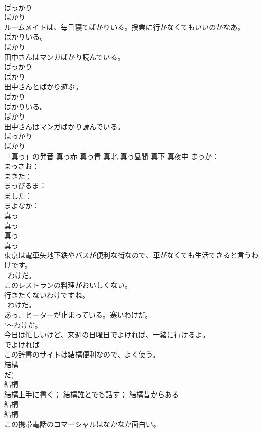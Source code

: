 \documentclass[8pt]{extreport}
\begin{document}
\begin{CJK}{UTF8}{min}
{\\	ばっかり 
\\	ばかり
\\	ルームメイトは、毎日寝てばかりいる。授業に行かなくてもいいのかなあ。	
\\	ばかりいる。 
\\	ばかり 
\\	田中さんはマンガばかり読んでいる。 
\\	ばっかり 
\\	ばかり
\\	田中さんとばかり遊ぶ。	
\\	ばかり　
\\	ばかりいる。 
\\	ばかり 
\\	田中さんはマンガばかり読んでいる。 
\\	ばっかり 
\\	ばかり
\\	「真っ」の発音 真っ赤 真っ青 真北 真っ昼間 真下 真夜中	まっか：
\\	まっさお：
\\	まきた：
\\	まっぴるま：
\\	ました： 
\\	まよなか： 
\\	真っ
\\	真っ
\\	真っ
\\	真っ 
\\	東京は電車矢地下鉄やバスが便利な街なので、車がなくても生活できると言うわけです。	
\\	~わけだ。 
\\	このレストランの料理がおいしくない。 
\\	行きたくないわけですね。	
\\	~わけだ。 
\\	あっ、ヒーターが止まっている。寒いわけだ。	
\\	"〜わけだ。 
\\	今日は忙しいけど、来週の日曜日でよければ、一緒に行けるよ。	
\\	でよければ 
\\	この辞書のサイトは結構便利なので、よく使う。	
\\	結構 
\\	だ) 
\\	結構 
\\	結構上手に書く； 結構誰とでも話す； 結構昔からある	
\\	結構 
\\	結構 
\\	この携帯電話のコマーシャルはなかなか面白い。	
}
\end{CJK}
\end{document}
